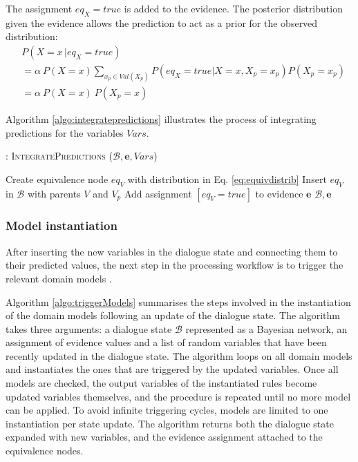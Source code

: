 The assignment $eq_{X} \!=\! true$ is added to the evidence. The posterior distribution given the evidence allows the prediction to act as a prior for the observed distribution:
\begin{align}
&P(X = x \, | eq_{X}\!=\!true) \nonumber \\
&=  \alpha \ P(X\!=\!x)  \sum_{x_p \in Val(X_p)} P(eq_{X}\!=\!true | X\!=\!x, X_p \!=\!x_p ) P(X_p\!=\!x_p) \\
&= \alpha \ P(X\!=\!x) \ P(X_p\!=\!x) \label{eq:equivalence}
\end{align}

Algorithm \ref{algo:integratepredictions} illustrates the process of integrating predictions for the variables $\mathit{Vars}$. 

\begin{algorithm}[h]
\caption{: \textsc{IntegratePredictions} ($\mathcal{B}, \mathbf{e}, \mathit{Vars}$)}
\begin{algorithmic}[1] \vspace{1mm}
\STATE Create equivalence node $eq_{V}$ with distribution in Eq. \eqref{eq:equivdistrib}
\STATE Insert $eq_{V}$ in $\mathcal{B}$ with parents $\mathit{V}$ and $\mathit{V}_p$
\STATE Add assignment $[eq_{V}\!=\!true]$ to evidence $\mathbf{e}$
\ENDIF
\ENDFOR
\RETURN $\mathcal{B}, \mathbf{e}$
\end{algorithmic}
\label{algo:integratepredictions}
\end{algorithm}

\subsubsection*{Model instantiation}

After inserting the new variables in the dialogue state and connecting them to their predicted values, the next step in the processing workflow is to trigger the relevant domain models . 

Algorithm \ref{algo:triggerModels} summarises the steps involved in the instantiation of the domain models following an update of the dialogue state. The algorithm takes three arguments: a dialogue state $\mathcal{B}$ represented as a Bayesian network, an assignment of evidence values and a list of random variables that have been recently updated in the dialogue state. The algorithm loops on all domain models and instantiates the ones that are triggered by the updated variables. Once all models are checked, the output variables of the instantiated rules become updated variables themselves, and the procedure is repeated until no more model can be applied.  To avoid infinite triggering cycles, models are limited to one instantiation per state update. The algorithm returns both the dialogue state expanded with new variables, and the evidence assignment attached to the equivalence nodes. 


